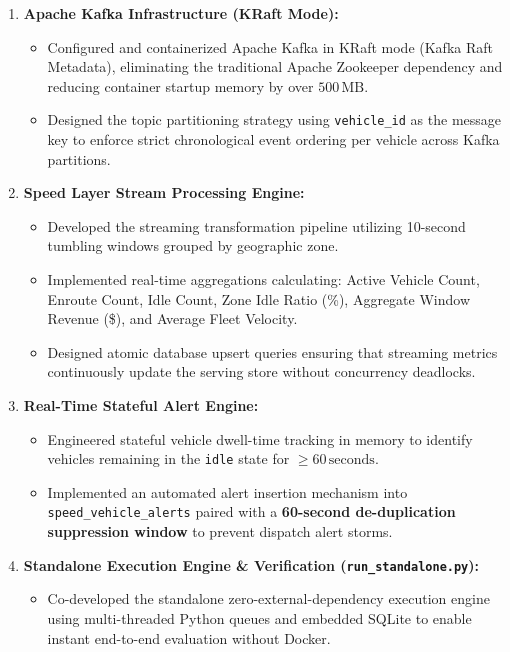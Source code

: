 \documentclass[11pt,a4paper]{article}
\begin{document}
\begin{enumerate}
    \item \textbf{Apache Kafka Infrastructure (KRaft Mode):}
    \begin{itemize}
        \item Configured and containerized Apache Kafka in KRaft mode (Kafka Raft Metadata), eliminating the traditional Apache Zookeeper dependency and reducing container startup memory by over $500\,\text{MB}$.
        \item Designed the topic partitioning strategy using \texttt{vehicle\_id} as the message key to enforce strict chronological event ordering per vehicle across Kafka partitions.
    \end{itemize}

    \item \textbf{Speed Layer Stream Processing Engine:}
    \begin{itemize}
        \item Developed the streaming transformation pipeline utilizing 10-second tumbling windows grouped by geographic zone.
        \item Implemented real-time aggregations calculating: Active Vehicle Count, Enroute Count, Idle Count, Zone Idle Ratio (\%), Aggregate Window Revenue (\$), and Average Fleet Velocity.
        \item Designed atomic database upsert queries ensuring that streaming metrics continuously update the serving store without concurrency deadlocks.
    \end{itemize}

    \item \textbf{Real-Time Stateful Alert Engine:}
    \begin{itemize}
        \item Engineered stateful vehicle dwell-time tracking in memory to identify vehicles remaining in the \texttt{idle} state for $\ge 60\,\text{seconds}$.
        \item Implemented an automated alert insertion mechanism into \texttt{speed\_vehicle\_alerts} paired with a \textbf{60-second de-duplication suppression window} to prevent dispatch alert storms.
    \end{itemize}

    \item \textbf{Standalone Execution Engine \& Verification (\texttt{run\_standalone.py}):}
    \begin{itemize}
        \item Co-developed the standalone zero-external-dependency execution engine using multi-threaded Python queues and embedded SQLite to enable instant end-to-end evaluation without Docker.
    \end{itemize}
\end{enumerate}
\end{document}
